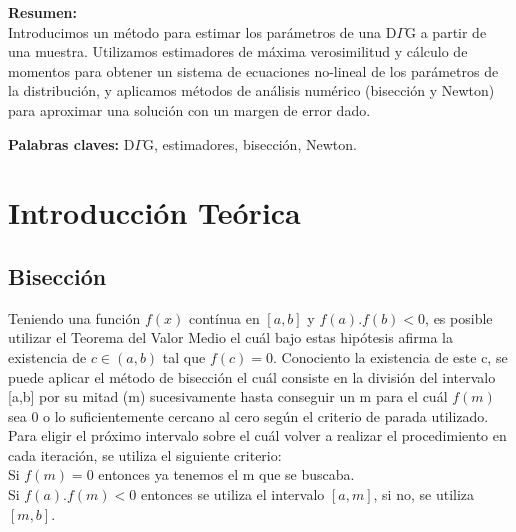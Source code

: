 \documentclass[a4paper,10pt,twoside]{article}
\begin{document}
\textbf{Resumen:} \\
Introducimos un método para estimar los parámetros de una D$\Gamma$G a partir de una muestra.
Utilizamos estimadores de máxima verosimilitud y cálculo de momentos para obtener un sistema
de ecuaciones no-lineal de los parámetros de la distribución, y aplicamos métodos de análisis
numérico (bisección y Newton) para aproximar una solución con un margen de error dado.

\textbf{Palabras claves:} D$\Gamma$G, estimadores, bisección, Newton.

\vspace{6cm}

\newpage




\tableofcontents

\newpage




\section{Introducción Teórica}

\subsection{Bisección}
Teniendo una función $f(x)$ contínua en $[a,b]$ y $f(a).f(b) < 0$, es posible utilizar el Teorema del Valor Medio el cuál bajo estas hipótesis afirma la existencia de $c \in (a,b)$ tal que $f(c) = 0$. Conociento la existencia de este c, se puede aplicar el método de bisección el cuál consiste en la división del intervalo [a,b] por su mitad (m) sucesivamente hasta conseguir un m para el cuál $f(m)$ sea 0 o lo suficientemente cercano al cero según el criterio de parada utilizado.
Para eligir el próximo intervalo sobre el cuál volver a realizar el procedimiento en cada iteración, se utiliza el siguiente criterio: \\
Si $f(m) = 0$ entonces ya tenemos el m que se buscaba. \\
Si $f(a).f(m) < 0$ entonces se utiliza el intervalo $[a,m]$, si no, se utiliza $[m,b]$.
\end{document}
